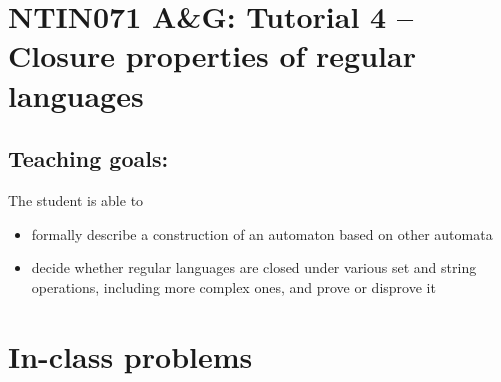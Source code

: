 \documentclass[a4paper,12pt]{amsart}
\begin{document}
\thispagestyle{empty}

\section*{NTIN071 A\&G: Tutorial 4 -- Closure properties of regular languages}

\medskip

\subsection*{Teaching goals:} The student is able to

    \begin{itemize}\setlength{\itemsep}{0pt}
        \item formally describe a construction of an automaton based on other automata
        \item decide whether regular languages are closed under various set and string operations, including more complex ones, and prove or disprove it
    \end{itemize}


\section*{In-class problems}
\end{document}
